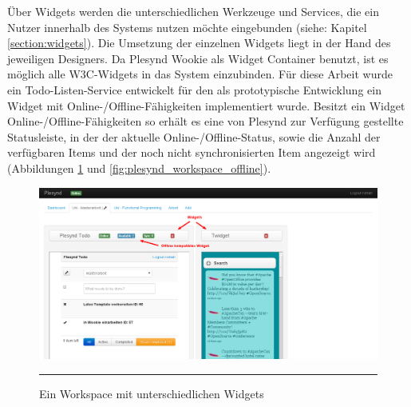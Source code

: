 Über Widgets werden die unterschiedlichen Werkzeuge und Services, die ein Nutzer innerhalb des Systems nutzen möchte eingebunden (siehe: Kapitel \ref{section:widgets}). Die Umsetzung der einzelnen Widgets liegt in der Hand des jeweiligen Designers. Da Plesynd Wookie als Widget Container benutzt, ist es möglich alle W3C-Widgets in das System einzubinden. Für diese Arbeit wurde ein Todo-Listen-Service entwickelt für den als prototypische Entwicklung ein Widget mit Online-/Offline-Fähigkeiten implementiert wurde. Besitzt ein Widget Online-/Offline-Fähigkeiten so erhält es eine von Plesynd zur Verfügung gestellte Statusleiste, in der der aktuelle Online-/Offline-Status, sowie die Anzahl der verfügbaren Items und der noch nicht synchronisierten Item angezeigt wird (Abbildungen \ref{fig:plesynd_workspace_online} und \ref{fig:plesynd_workspace_offline}).
\begin{figure}
  \centering
  \includegraphics[width=\textwidth,height=\textheight,keepaspectratio]{./Figures/plesynd_workspace_online.png}
    \rule{35em}{0.5pt}
  \caption[Plesynd User-Interface: Workspace Online]{Ein Workspace mit unterschiedlichen Widgets}
  \label{fig:plesynd_workspace_online}
\end{figure}

